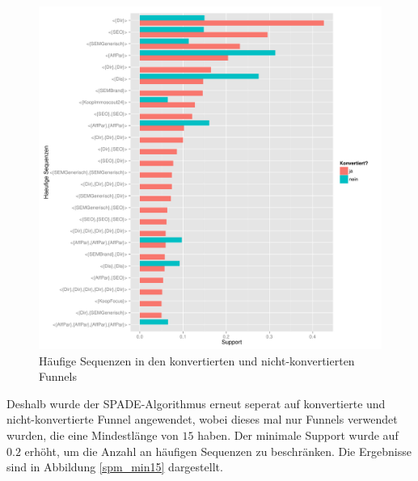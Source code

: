 \begin{figure}[H]
	\centering\includegraphics[scale=0.6]{spm_all.pdf}\caption[Häufige Sequenzen]{Häufige Sequenzen in den konvertierten und nicht-konvertierten Funnels}\label{spm_all}
\end{figure}
Deshalb wurde der SPADE-Algorithmus erneut seperat auf konvertierte und nicht-konvertierte Funnel angewendet, wobei dieses mal nur Funnels verwendet wurden, die eine Mindestlänge von $15$ haben. Der minimale Support wurde auf $0.2$ erhöht, um die Anzahl an häufigen Sequenzen zu beschränken. Die Ergebnisse sind in Abbildung \ref{spm_min15} dargestellt.\\
